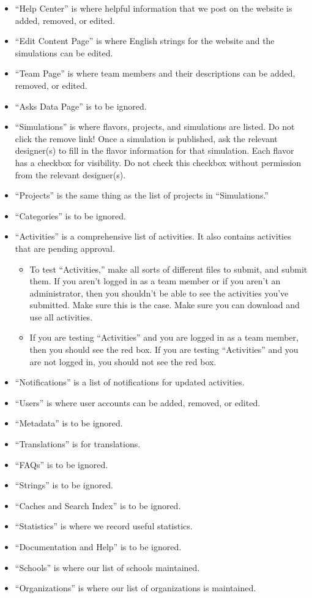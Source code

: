 \documentclass[titlepage]{article}
\begin{document}
		\begin{itemize}
			\item ``Help Center'' is where helpful information that we post on the website is added, removed, or edited.
			\item ``Edit Content Page'' is where English strings for the website and the simulations can be edited.
			\item ``Team Page'' is where team members and their descriptions can be added, removed, or edited.
			\item ``Asks Data Page'' is to be ignored.
			\item ``Simulations'' is where flavors, projects, and simulations are listed. Do not click the remove link! Once a simulation is published, ask the relevant designer(s) to fill in the flavor information for that simulation. Each flavor has a checkbox for visibility. Do not check this checkbox without permission from the relevant designer(s).
			\item ``Projects'' is the same thing as the list of projects in ``Simulations.''
			\item ``Categories'' is to be ignored.
			\item ``Activities'' is a comprehensive list of activities. It also contains activities that are pending approval.
				\begin{itemize}
					\item To test ``Activities,'' make all sorts of different files to submit, and submit them. If you aren't logged in as a team member or if you aren't an administrator, then you shouldn't be able to see the activities you've submitted. Make sure this is the case. Make sure you can download and use all activities.
					\item If you are testing ``Activities'' and you are logged in as a team member, then you should see the red box. If you are testing ``Activities'' and you are not logged in, you should not see the red box.
				\end{itemize}
			\item ``Notifications'' is a list of notifications for updated activities.
			\item ``Users'' is where user accounts can be added, removed, or edited.
			\item ``Metadata'' is to be ignored.
			\item ``Translations'' is for translations.
			\item ``FAQs'' is to be ignored.
			\item ``Strings'' is to be ignored.
			\item ``Caches and Search Index'' is to be ignored.
			\item ``Statistics'' is where we record useful statistics.
			\item ``Documentation and Help'' is to be ignored.
			\item ``Schools'' is where our list of schools maintained.
			\item ``Organizations'' is where our list of organizations is maintained.
		\end{itemize}
\end{document}
